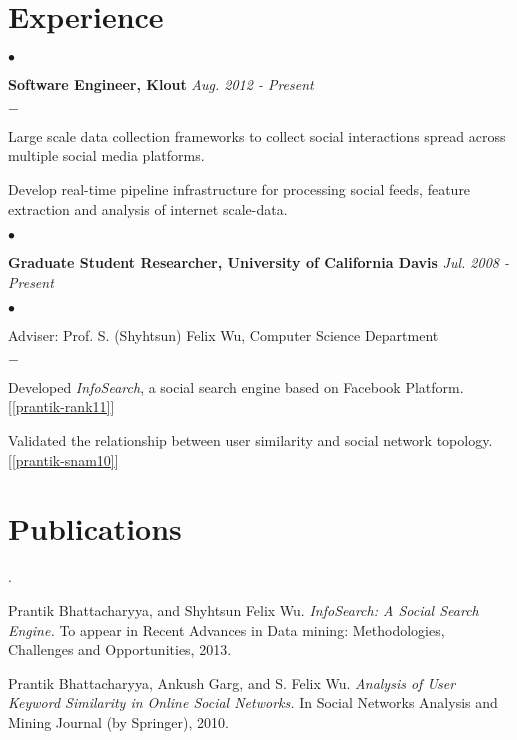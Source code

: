 \documentclass[line]{latex_lib/resume}
\newenvironment{list1}{
  \begin{list}{$\bullet$}{%
      \setlength{\itemsep}{0in}
      \setlength{\parsep}{0in} \setlength{\parskip}{0in}
      \setlength{\topsep}{0in} \setlength{\partopsep}{0in} 
      \setlength{\leftmargin}{0.11in}}}{\end{list}}
\newenvironment{list2}{
  \begin{list}{$-$}{%
      \setlength{\itemsep}{0in}
      \setlength{\parsep}{0in} \setlength{\parskip}{0in}
      \setlength{\topsep}{0in} \setlength{\partopsep}{0in} 
      \setlength{\leftmargin}{0.175in}}}{\end{list}
}
\newcounter{itemcounter}
\newenvironment{list3}{
  \begin{list}{\arabic{itemcounter}.}{\usecounter{itemcounter}\leftmargin=0.15in}{%
      \setlength{\itemsep}{0in}
      \setlength{\parsep}{0in} \setlength{\parskip}{0in}
      \setlength{\topsep}{0in} \setlength{\partopsep}{0in} 
      }}{\end{list}
}
\begin{document}
\begin{resume}
\section{\sc \bf Experience}

\begin{list1}
\item {\bf Software Engineer, Klout} \hfill {\it{Aug. 2012 - Present}}

\begin{list2}
\item Large scale data collection frameworks to collect social interactions spread across multiple social media platforms.
\item	Develop real-time pipeline infrastructure for processing social feeds, feature extraction and analysis of internet scale-data.
\end{list2}
\end{list1}


\begin{list1}
\item {\bf Graduate Student Researcher, University of California Davis} \hfill {\it{Jul. 2008 - Present}}
\begin{list1}
\item[]
Adviser: Prof. S. (Shyhtsun) Felix Wu, Computer Science Department\\
\end{list1}

\begin{list2}
\item Developed \textit{InfoSearch}, a social search engine based on Facebook Platform. [\ref{prantik-rank11}] 
\item Validated the relationship between user similarity and social network topology. [\ref{prantik-snam10}]
\end{list2}
\end{list1}


\section{\sc \bf Publications}
\begin{list3}
\item{\label{prantik-rank11} {Prantik Bhattacharyya}, and Shyhtsun Felix Wu. \textit{InfoSearch: A Social Search Engine.} To appear in Recent Advances in Data mining: Methodologies, Challenges and Opportunities, 2013.}

\item{\label{prantik-snam10}  {Prantik Bhattacharyya}, Ankush Garg, and S. Felix Wu. \textit{Analysis of User Keyword Similarity in Online Social Networks.} In Social Networks Analysis and Mining Journal (by Springer), 2010.}
\end{list3}


\end{resume}
\end{document}
